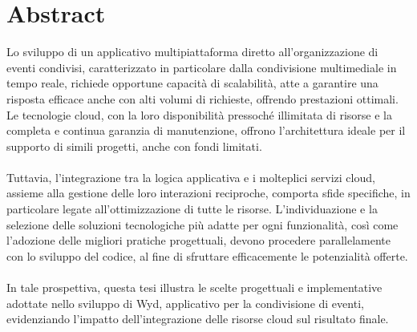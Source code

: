 

\chapter*{Abstract}


Lo sviluppo di un applicativo multipiattaforma diretto all'organizzazione di eventi condivisi,
caratterizzato in particolare dalla condivisione multimediale in tempo reale,
richiede opportune capacità di scalabilità, 
atte a garantire una risposta efficace anche con alti volumi di richieste, offrendo prestazioni ottimali. 
Le tecnologie cloud, con la loro disponibilità pressoché illimitata di risorse e la completa e continua garanzia  di manutenzione, 
offrono l'architettura ideale per il supporto di simili progetti, anche con fondi limitati.\\
\\
Tuttavia, l'integrazione tra la logica applicativa e i molteplici servizi cloud, 
assieme alla gestione delle loro interazioni reciproche, comporta sfide specifiche, 
in particolare legate all'ottimizzazione di tutte le risorse.
L'individuazione e la selezione delle soluzioni tecnologiche più adatte per ogni funzionalità, 
così come l'adozione delle migliori pratiche progettuali,
devono procedere parallelamente con lo sviluppo del codice, 
al fine di sfruttare efficacemente le potenzialità offerte.\\
\\
In tale prospettiva, 
questa tesi illustra le scelte progettuali e implementative adottate nello sviluppo di Wyd,
applicativo per la condivisione di eventi,
evidenziando l'impatto dell'integrazione delle risorse cloud sul risultato finale.\\
\clearpage